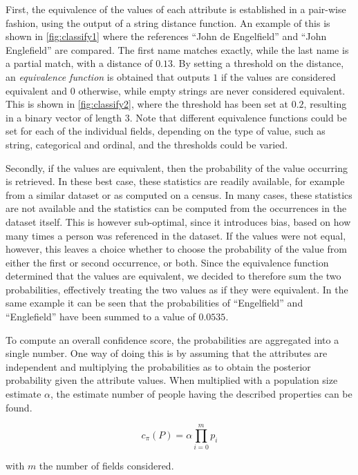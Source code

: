First, the equivalence of the values of each attribute is established in a pair-wise fashion, using the output of a string distance function.
An example of this is shown in \cref{fig:classify1} where the references ``John de Engelfield'' and ``John Englefield'' are compared.
The first name matches exactly, while the last name is a partial match, with a distance of $0.13$.
By setting a threshold on the distance, an \emph{equivalence function} is obtained that outputs $1$ if the values are considered equivalent and $0$ otherwise, while empty strings are never considered equivalent.
This is shown in \cref{fig:classify2}, where the threshold has been set at $0.2$, resulting in a binary vector of length $3$.
Note that different equivalence functions could be set for each of the individual fields, depending on the type of value, such as string, categorical and ordinal, and the thresholds could be varied.

Secondly, if the values are equivalent, then the probability of the value occurring is retrieved.
In these best case, these statistics are readily available, for example from a similar dataset or as computed on a census.
In many cases, these statistics are not available and the statistics can be computed from the occurrences in the dataset itself.
This is however sub-optimal, since it introduces bias, based on how many times a person was referenced in the dataset.
If the values were not equal, however, this leaves a choice whether to choose the probability of the value from either the first or second occurrence, or both.
Since the equivalence function determined that the values are equivalent, we decided to therefore sum the two probabilities, effectively treating the two values as if they were equivalent.
In the same example it can be seen that the probabilities of ``Engelfield'' and ``Englefield'' have been summed to a value of $0.0535$.

To compute an overall confidence score, the probabilities are aggregated into a single number.
One way of doing this is by assuming that the attributes are independent and multiplying the probabilities as to obtain the posterior probability given the attribute values.
When multiplied with a population size estimate $\alpha$, the estimate number of people having the described properties can be found.

\begin{equation}
    c_{\pi}(P) = \alpha \prod_{i=0}^{m} p_i
\end{equation}

\noindent with $m$ the number of fields considered.

